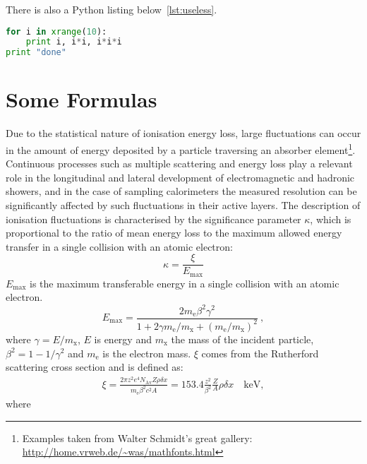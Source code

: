 There is also a Python listing below~\autoref{lst:useless}.

\begin{lstlisting}[float=b,language=Python,frame=tb,caption={A floating example (\texttt{listings} manual)},label=lst:useless]
for i in xrange(10):
    print i, i*i, i*i*i
print "done"
\end{lstlisting}

\section{Some Formulas}

Due to the statistical nature of ionisation energy loss, large fluctuations can occur in the amount of energy deposited by a particle traversing an absorber element\footnote{Examples taken from Walter Schmidt's great gallery: \\ \url{http://home.vrweb.de/~was/mathfonts.html}}.  Continuous processes such as multiple scattering and energy loss play a relevant role in the longitudinal and lateral development of electromagnetic and hadronic showers, and in the case of sampling calorimeters the measured resolution can be significantly affected by such fluctuations in their active layers.  The description of ionisation fluctuations is characterised by the significance parameter $\kappa$, which is proportional to the ratio of mean energy loss to the maximum allowed energy transfer in a single collision with an atomic electron: 
\begin{equation}
\kappa =\frac{\xi}{E_{\mathrm{max}}} %
\end{equation}
$E_{\mathrm{max}}$ is the maximum transferable energy in a single collision with an atomic electron.
\[E_{\mathrm{max}} =\frac{2 m_{\mathrm{e}} \beta^2\gamma^2 }{1 + 2\gamma m_{\mathrm{e}}/m_{\mathrm{x}} + \left ( m_{\mathrm{e}} /m_{\mathrm{x}}\right)^2}\ ,\]
where $\gamma = E/m_{\mathrm{x}}$, $E$ is energy and $m_{\mathrm{x}}$ the mass of the incident particle, $\beta^2 = 1 - 1/\gamma^2$ and $m_{\mathrm{e}}$ is the electron mass. $\xi$ comes from the Rutherford scattering cross section and is defined as:
\begin{eqnarray*} \xi  = \frac{2\pi z^2 e^4 N_{\mathrm{Av}} Z \rho
\delta x}{m_{\mathrm{e}} \beta^2 c^2 A} =  153.4 \frac{z^2}{\beta^2}
\frac{Z}{A}
\rho \delta x \quad\mathrm{keV},
\end{eqnarray*}
where

